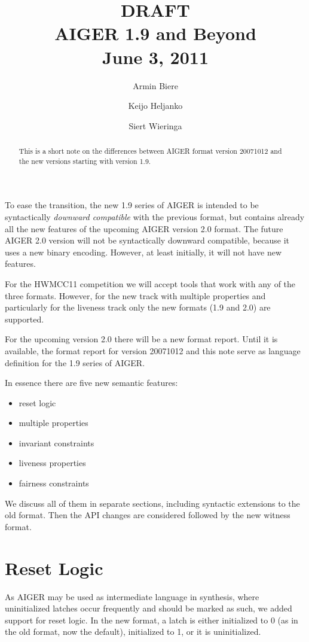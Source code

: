 \documentclass{llncs}
\title{
{\color{blue}\large DRAFT}\\
  AIGER 1.9 and Beyond \\
{\color{blue}\large June 3, 2011}}
\author{Armin Biere\inst{1} \and
Keijo Heljanko\inst{2} \and
Siert Wieringa\inst{2}}
\institute{Johannes Kepler University, Austria \and Alto University, Finland}
\begin{document}
\maketitle
\begin{abstract}
This is a short note on the differences between AIGER format version 20071012
and the new versions starting with version 1.9.
\end{abstract}
To ease the transition, the new 1.9 series of AIGER is intended to be
syntactically \emph{downward compatible} with the previous format, but contains
already all the new features of the upcoming AIGER version 2.0 format.  The
future AIGER 2.0 version will not be syntactically downward compatible, because
it uses a new binary encoding.  However, at least initially, it will not have
new features.

For the HWMCC11 competition we will accept tools that work with any of
the three formats.  However, for the new track with multiple properties and 
particularly for the liveness track only the new formats (1.9 and 2.0) are
supported.

For the upcoming version 2.0 there will be a new format report. Until it is
available, the format report for version 20071012 and this note serve as
language definition for the 1.9 series of AIGER.  

In essence there are five new semantic features:

\begin{itemize}
\item reset logic
\item multiple properties
\item invariant constraints
\item liveness properties
\item fairness constraints
\end{itemize}

We discuss all of them in separate sections, including syntactic
extensions to the old format.   Then the API changes are considered followed
by the new witness format.

\section{Reset Logic}

As AIGER may be used as intermediate language in synthesis, where
uninitialized latches occur frequently and should be marked as such, we
added support for reset logic.  In the new format, a latch is either
initialized to 0 (as in the old format, now the default), initialized to 1,
or it is uninitialized.
\end{document}
